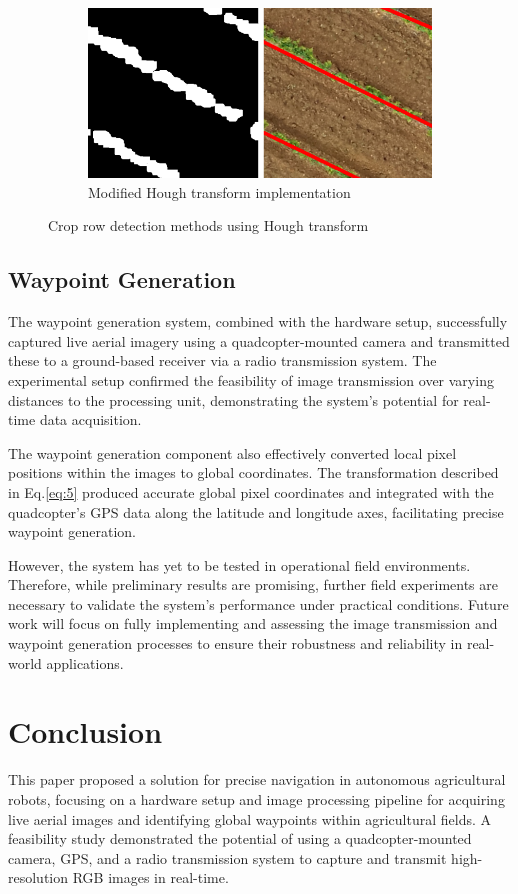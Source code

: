 \documentclass[conference]{IEEEtran}
\begin{document}
\begin{figure}[t]
		\begin{subfigure}{\linewidth}
			\centering
			\includegraphics[width=0.7\linewidth]{Hough Revised2.png}
			\caption{Modified Hough transform implementation}
			\label{fig_Hough_mod}
		\end{subfigure}
		
		\caption{Crop row detection methods using Hough transform \cite{b5}}
		\label{fig:comparison}
	\end{figure}
	
	\subsection{Waypoint Generation}
	
	The waypoint generation system, combined with the hardware setup, successfully captured live aerial imagery using a quadcopter-mounted camera and transmitted these to a ground-based receiver via a radio transmission system. The experimental setup confirmed the feasibility of image transmission over varying distances to the processing unit, demonstrating the system’s potential for real-time data acquisition.
	
	The waypoint generation component also effectively converted local pixel positions within the images to global coordinates. The transformation described in Eq.\ref{eq:5} produced accurate global pixel coordinates and integrated with the quadcopter’s GPS data along the latitude and longitude axes, facilitating precise waypoint generation.
	
	However, the system has yet to be tested in operational field environments. Therefore, while preliminary results are promising, further field experiments are necessary to validate the system’s performance under practical conditions. Future work will focus on fully implementing and assessing the image transmission and waypoint generation processes to ensure their robustness and reliability in real-world applications.
	
	
	\section{Conclusion}\label{Conclusion}
	This paper proposed a solution for precise navigation in autonomous agricultural robots, focusing on a hardware setup and image processing pipeline for acquiring live aerial images and identifying global waypoints within agricultural fields. A feasibility study demonstrated the potential of using a quadcopter-mounted camera, GPS, and a radio transmission system to capture and transmit high-resolution RGB images in real-time.
	
\end{document}
